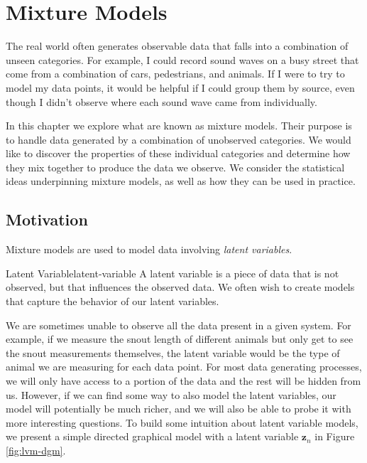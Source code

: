 \chapter{Mixture Models}
The real world often generates observable data that falls into a combination of unseen categories. For example, I could record sound waves on a busy street that come from a combination of cars, pedestrians, and animals. If I were to try to model my data points, it would be helpful if I could group them by source, even though I didn't observe where each sound wave came from individually.

In this chapter we explore what are known as mixture models. Their purpose is to handle data generated by a combination of unobserved categories. We would like to discover the properties of these individual categories and determine how they mix together to produce the data we observe. We consider the statistical ideas underpinning mixture models, as well as how they can be used in practice.

\section{Motivation}
Mixture models are used to model data involving \textit{latent variables}.

\begin{definition}{Latent Variable}{latent-variable}
    A latent variable is a piece of data that is not observed, but that influences the observed data. We often wish to create models that capture the behavior of our latent variables.
\end{definition}

We are sometimes unable to observe all the data present in a given system. For example, if we measure the snout length of different animals but only get to see the snout measurements themselves, the latent variable would be the type of animal we are measuring for each data point. For most data generating processes, we will only have access to a portion of the data and the rest will be hidden from us. However, if we can find some way to also model the latent variables, our model will potentially be much richer, and we will also be able to probe it with more interesting questions. To build some intuition about latent variable models, we present a simple directed graphical model with a latent variable $\textbf{z}_n$ in Figure \ref{fig:lvm-dgm}.

